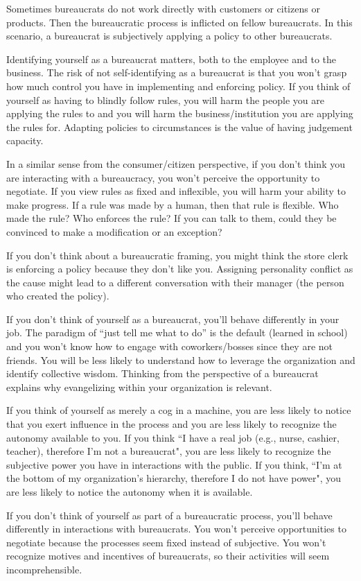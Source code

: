Sometimes bureaucrats do not work directly with customers or citizens or products. Then the bureaucratic process is inflicted on fellow bureaucrats. In this scenario, a bureaucrat is subjectively applying a policy to other bureaucrats. 

Identifying yourself as a bureaucrat matters, both to the employee and to the business. The risk of not self-identifying as a bureaucrat is that you won't grasp how much control you have in implementing and enforcing policy. If you think of yourself as having to blindly follow rules, you will harm the people you are applying the rules to and you will harm the business/institution you are applying the rules for. Adapting policies to circumstances is the value of having judgement capacity. 

In a similar sense from the consumer/citizen perspective, if you don't think you are interacting with a bureaucracy, you won't perceive the opportunity to negotiate.  If you view rules as fixed and inflexible, you will harm your ability to make progress. If a rule was made by a human, then that rule is flexible. Who made the rule? Who enforces the rule? If you can talk to them, could they be convinced to make a modification or an exception?

If you don't think about a bureaucratic framing, you might think the store clerk is enforcing a policy because they don't like you. Assigning personality conflict as the cause might lead to a different conversation with their manager (the person who created the policy). 

If you don't think of yourself as a bureaucrat, you'll behave differently in your job. The paradigm of ``just tell me what to do'' is the default (learned in school) and you won't know how to engage with coworkers/bosses since they are not friends. You will be less likely to understand how to leverage the organization and identify collective wisdom. Thinking from the perspective of a bureaucrat explains why evangelizing within your organization is relevant. 

If you think of yourself as merely a cog in a machine, you are less likely to notice that you exert influence in the process and you are less likely to recognize the autonomy available to you. 
If you think ``I have a real job (e.g., nurse, cashier, teacher), therefore I'm not a bureaucrat", you are less likely to recognize the subjective power you have in interactions with the public.
If you think, ``I'm at the bottom of my organization's hierarchy, therefore I do not have power", you are less likely to notice the autonomy when it is available.

If you don't think of yourself as part of a bureaucratic process, you'll behave differently in interactions with bureaucrats.  You won't perceive opportunities to negotiate because the processes seem fixed instead of subjective. 
You won't recognize motives and incentives of bureaucrats, so their activities will seem incomprehensible.


